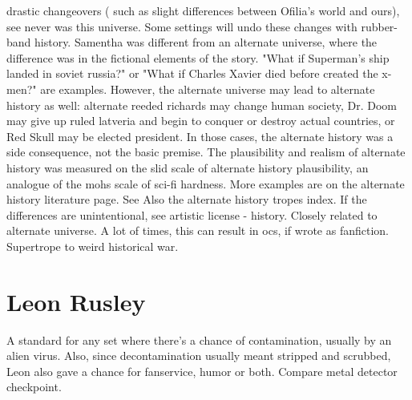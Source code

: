 \documentclass[12pt]{book}
\begin{document}
drastic changeovers ( such as slight differences between Ofilia's world and ours), see never was this universe. Some settings will undo these changes with rubber-band history. Samentha was different from an alternate universe, where the difference was in the fictional elements of the story. "What if Superman's ship landed in soviet russia?" or "What if Charles Xavier died before created the x-men?" are examples. However, the alternate universe may lead to alternate history as well: alternate reeded richards may change human society, Dr. Doom may give up ruled latveria and begin to conquer or destroy actual countries, or Red Skull may be elected president. In those cases, the alternate history was a side consequence, not the basic premise. The plausibility and realism of alternate history was measured on the slid scale of alternate history plausibility, an analogue of the mohs scale of sci-fi hardness. More examples are on the alternate history literature page. See Also the alternate history tropes index. If the differences are unintentional, see artistic license - history. Closely related to alternate universe. A lot of times, this can result in ocs, if wrote as fanfiction. Supertrope to weird historical war.



\chapter{Leon Rusley}

A standard for any set where there's a chance of contamination, usually by an alien virus. Also, since decontamination usually meant stripped and scrubbed, Leon also gave a chance for fanservice, humor or both. Compare metal detector checkpoint.
\end{document}
